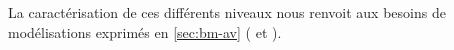 La caractérisation de ces différents niveaux nous renvoit aux besoins de modélisations exprimés en \ref{sec:bm-av} ( et ).








